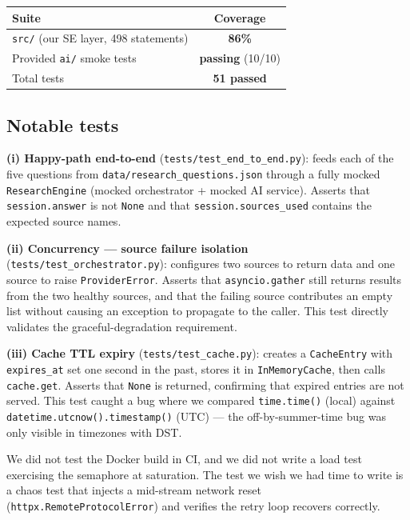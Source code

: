 \documentclass[11pt,a4paper]{article}
\begin{document}
\begin{center}\small
\begin{tabular}{lc}
\toprule
\textbf{Suite} & \textbf{Coverage} \\
\midrule
\texttt{src/} (our SE layer, 498 statements) & \textbf{86\%} \\
Provided \texttt{ai/} smoke tests & \textbf{passing} (10/10) \\
Total tests & \textbf{51 passed} \\
\bottomrule
\end{tabular}
\end{center}

\subsection{Notable tests}

\textbf{(i) Happy-path end-to-end} (\texttt{tests/test\_end\_to\_end.py}): feeds each of the five questions from \texttt{data/research\_questions.json} through a fully mocked \texttt{ResearchEngine} (mocked orchestrator + mocked AI service). Asserts that \texttt{session.answer} is not \texttt{None} and that \texttt{session.sources\_used} contains the expected source names.

\textbf{(ii) Concurrency --- source failure isolation} (\texttt{tests/test\_orchestrator.py}): configures two sources to return data and one source to raise \texttt{ProviderError}. Asserts that \texttt{asyncio.gather} still returns results from the two healthy sources, and that the failing source contributes an empty list without causing an exception to propagate to the caller. This test directly validates the graceful-degradation requirement.

\textbf{(iii) Cache TTL expiry} (\texttt{tests/test\_cache.py}): creates a \texttt{CacheEntry} with \texttt{expires\_at} set one second in the past, stores it in \texttt{InMemoryCache}, then calls \texttt{cache.get}. Asserts that \texttt{None} is returned, confirming that expired entries are not served. This test caught a bug where we compared \texttt{time.time()} (local) against \texttt{datetime.utcnow().timestamp()} (UTC) --- the off-by-summer-time bug was only visible in timezones with DST.

We did not test the Docker build in CI, and we did not write a load test exercising the semaphore at saturation. The test we wish we had time to write is a chaos test that injects a mid-stream network reset (\texttt{httpx.RemoteProtocolError}) and verifies the retry loop recovers correctly.
\end{document}
